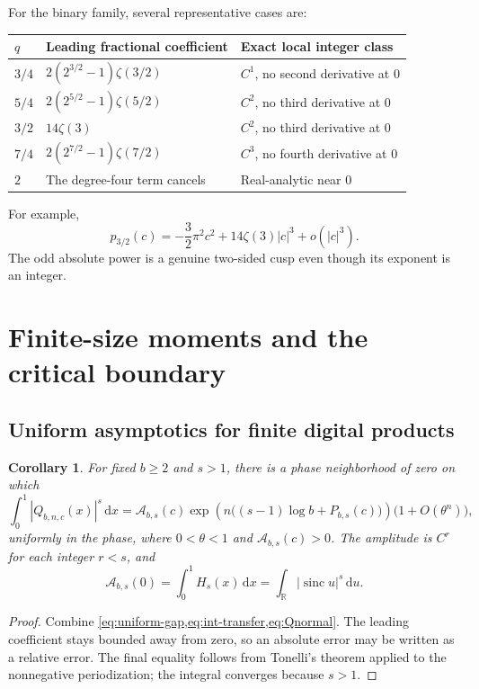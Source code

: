 \documentclass[11pt,a4paper]{article}
\numberwithin{equation}{section}
\newtheorem{corollary}[corollary]{Corollary}
\theoremstyle{definition}
\theoremstyle{remark}
\newcommand{\RR}{\mathbb R}
\newcommand{\dd}{\,\mathrm d}
\newcommand{\sinc}{\operatorname{sinc}}
\begin{document}
For the binary family, several representative cases are:
\begin{center}
\begin{tabular}{@{}lll@{}}
\toprule
$q$ & Leading fractional coefficient & Exact local integer class\\
\midrule
$3/4$ & $2(2^{3/2}-1)\zeta(3/2)$ & $C^1$, no second derivative at $0$\\
$5/4$ & $2(2^{5/2}-1)\zeta(5/2)$ & $C^2$, no third derivative at $0$\\
$3/2$ & $14\zeta(3)$ & $C^2$, no third derivative at $0$\\
$7/4$ & $2(2^{7/2}-1)\zeta(7/2)$ & $C^3$, no fourth derivative at $0$\\
$2$ & The degree-four term cancels & Real-analytic near $0$\\
\bottomrule
\end{tabular}
\end{center}
For example,
\[
 p_{3/2}(c)=-\frac32\pi^2c^2+14\zeta(3)|c|^3+o(|c|^3).
\]
The odd absolute power is a genuine two-sided cusp even though its
exponent is an integer.

\section{Finite-size moments and the critical boundary}
\label{sec:moments}

\subsection{Uniform asymptotics for finite digital products}
\begin{corollary}
\label{cor:moments}
For fixed $b\ge2$ and $s>1$, there is a phase neighborhood of zero on
which
\begin{equation}
 \int_0^1|Q_{b,n,c}(x)|^s\dd x
 =\mathcal A_{b,s}(c)
 \exp\!\left(n\bigl((s-1)\log b+P_{b,s}(c)\bigr)\right)
 \bigl(1+O(\theta^n)\bigr),
 \label{eq:moment-asymp}
\end{equation}
uniformly in the phase, where $0<\theta<1$ and
$\mathcal A_{b,s}(c)>0$. The amplitude is $C^r$ for each integer $r<s$,
and
\begin{equation}
 \mathcal A_{b,s}(0)=\int_0^1H_s(x)\dd x
 =\int_{\RR}|\sinc u|^s\dd u.
 \label{eq:amplitude-moment}
\end{equation}
\end{corollary}
\begin{proof}
Combine \cref{eq:uniform-gap,eq:int-transfer,eq:Qnormal}. The leading
coefficient stays bounded away from zero, so an absolute error may be
written as a relative error. The final equality follows from Tonelli's
theorem applied to the nonnegative periodization; the integral converges
because $s>1$.
\end{proof}
\end{document}
